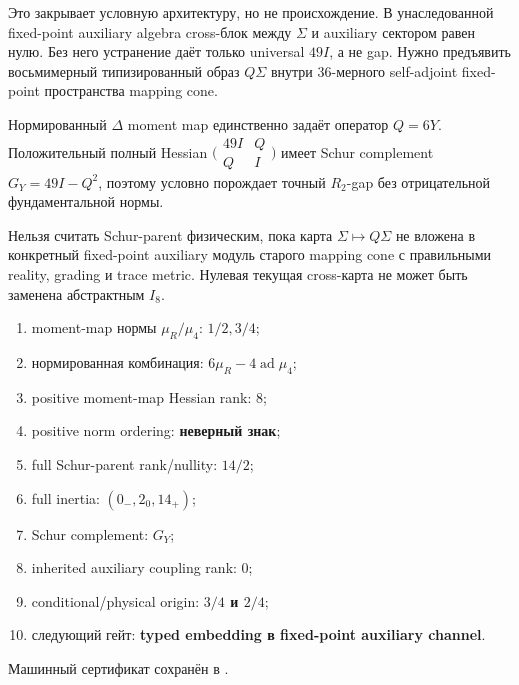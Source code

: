 Это закрывает условную архитектуру, но не происхождение. В унаследованной
fixed-point auxiliary algebra cross-блок между $\Sigma$ и auxiliary
сектором равен нулю. Без него устранение даёт только universal $49I$, а не
gap. Нужно предъявить восьмимерный типизированный образ $Q\Sigma$ внутри
36-мерного self-adjoint fixed-point пространства mapping cone.

\begin{theorem}
Нормированный $\Delta$ moment map единственно задаёт оператор $Q=6Y$.
Положительный полный Hessian $\bigl(\begin{smallmatrix}49I&Q\\Q&I\end{smallmatrix}\bigr)$
имеет Schur complement $G_Y=49I-Q^2$, поэтому условно порождает точный
$R_2$-gap без отрицательной фундаментальной нормы.
\end{theorem}

\begin{nogocriterion}
Нельзя считать Schur-parent физическим, пока карта
$\Sigma\mapsto Q\Sigma$ не вложена в конкретный fixed-point auxiliary
модуль старого mapping cone с правильными reality, grading и trace metric.
Нулевая текущая cross-карта не может быть заменена абстрактным $I_8$.
\end{nogocriterion}

\begin{protocol}\begin{enumerate}
\item moment-map нормы $\mu_R/\mu_4$: \textbf{$1/2,3/4$};
\item нормированная комбинация: \textbf{$6\mu_R-4\operatorname{ad}\mu_4$};
\item positive moment-map Hessian rank: \textbf{$8$};
\item positive norm ordering: \textbf{неверный знак};
\item full Schur-parent rank/nullity: \textbf{$14/2$};
\item full inertia: \textbf{$(0_-,2_0,14_+)$};
\item Schur complement: \textbf{$G_Y$};
\item inherited auxiliary coupling rank: \textbf{$0$};
\item conditional/physical origin: \textbf{$3/4$ и $2/4$};
\item следующий гейт: \textbf{typed embedding в fixed-point auxiliary channel}.
\end{enumerate}\end{protocol}

Машинный сертификат сохранён в
.